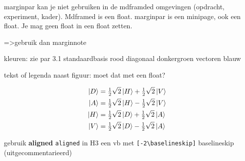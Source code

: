 \documentclass[../../main.tex]{subfiles}
\begin{document}
marginpar kan je niet gebruiken in de mdframded omgevingen (opdracht, experiment, kader). Mdframed is een float. 
marginpar is  een minipage, ook een float. Je mag geen float in een float zetten.

=>gebruik dan marginnote


kleuren:
zie par 3.1
standaardbasis rood
diagonaal donkergroen 
vectoren blauw

tekst of legenda naast figuur: moet dat met een float?
\begin{flushleft}
\begin{minipage}{.35\textwidth}
\end{minipage}%
\hfill
\begin{minipage}{.45\textwidth}
\[\begin{aligned}
\ket{D}&=\tfrac{1}{2}\sqrt{2}\ket{H}+\tfrac{1}{2}\sqrt{2}\ket{V}\\
\ket{A}&=\tfrac{1}{2}\sqrt{2}\ket{H}-\tfrac{1}{2}\sqrt{2}\ket{V}\\ 
\ket{H}&=\tfrac{1}{2}\sqrt{2}\ket{D}+\tfrac{1}{2}\sqrt{2}\ket{A}\\
\ket{V}&=\tfrac{1}{2}\sqrt{2}\ket{D}-\tfrac{1}{2}\sqrt{2}\ket{A}\\
\end{aligned}\]%
\label{fig:twobases}
\end{minipage}
\end{flushleft}

gebruik \textbf{aligned} \verb+aligned+ in H3 een vb met \verb+[-2\baselineskip]+ baselineskip (uitgecommentarieerd)
\end{document}
